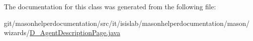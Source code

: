The documentation for this class was generated from the following file\-:\begin{DoxyCompactItemize}
\item 
git/masonhelperdocumentation/src/it/isislab/masonhelperdocumentation/mason/wizards/\hyperlink{_d___agent_description_page_8java}{D\-\_\-\-Agent\-Description\-Page.\-java}\end{DoxyCompactItemize}
